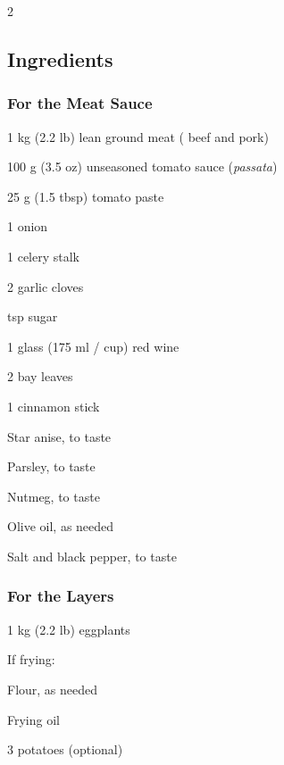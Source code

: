 \newpage
{}

\begin{multicols}{2}
	\subsection*{Ingredients}
	
	\subsubsection*{For the Meat Sauce}
	\begin{ingredients}
		\item 1 kg (2.2 lb) lean ground meat ( beef and  pork)
		\item 100 g (3.5 oz) unseasoned tomato sauce (\textit{passata})
		\item 25 g (1.5 tbsp) tomato paste
		\item 1 onion
		\item 1 celery stalk
		\item 2 garlic cloves
		\item {} tsp sugar
		\item 1 glass (175 ml /  cup) red wine
		\item 2 bay leaves
		\item 1 cinnamon stick
		\item Star anise, to taste
		\item Parsley, to taste
		\item Nutmeg, to taste
		\item Olive oil, as needed
		\item Salt and black pepper, to taste
	\end{ingredients}
	
	\subsubsection*{For the Layers}
	\begin{ingredients}
		\item 1 kg (2.2 lb) eggplants
		\item If frying:
		\begin{ingredients}
			\item Flour, as needed
			\item Frying oil
		\end{ingredients}
		\item 3 potatoes (optional)
	\end{ingredients}
	

\end{multicols}
